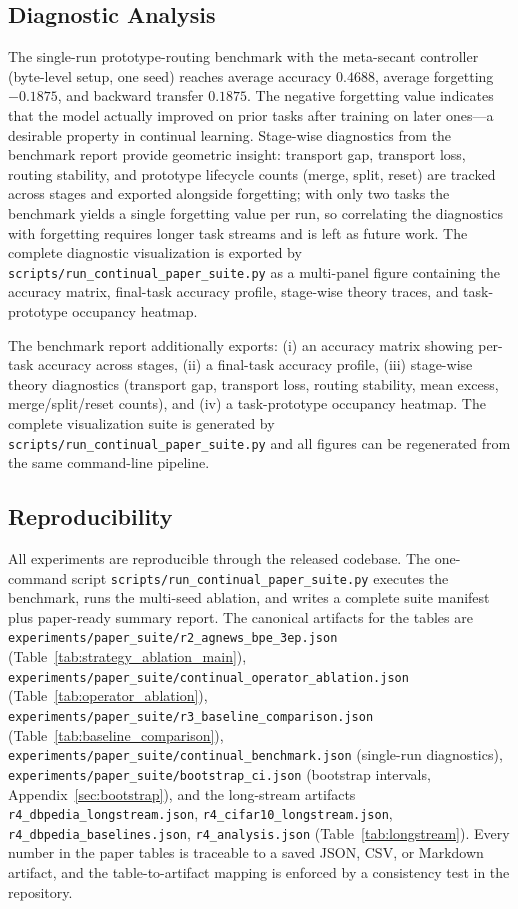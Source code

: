 \documentclass[11pt,a4paper]{article}
\theoremstyle{definition}
\begin{document}
\subsection{Diagnostic Analysis}

The single-run prototype-routing benchmark with the meta-secant controller (byte-level setup, one seed) reaches average accuracy $0.4688$, average forgetting $-0.1875$, and backward transfer $0.1875$. The negative forgetting value indicates that the model actually improved on prior tasks after training on later ones---a desirable property in continual learning. Stage-wise diagnostics from the benchmark report provide geometric insight: transport gap, transport loss, routing stability, and prototype lifecycle counts (merge, split, reset) are tracked across stages and exported alongside forgetting; with only two tasks the benchmark yields a single forgetting value per run, so correlating the diagnostics with forgetting requires longer task streams and is left as future work. The complete diagnostic visualization is exported by \texttt{scripts/run\_continual\_paper\_suite.py} as a multi-panel figure containing the accuracy matrix, final-task accuracy profile, stage-wise theory traces, and task-prototype occupancy heatmap.

The benchmark report additionally exports: (i) an accuracy matrix showing per-task accuracy across stages, (ii) a final-task accuracy profile, (iii) stage-wise theory diagnostics (transport gap, transport loss, routing stability, mean excess, merge/split/reset counts), and (iv) a task-prototype occupancy heatmap. The complete visualization suite is generated by \texttt{scripts/run\_continual\_paper\_suite.py} and all figures can be regenerated from the same command-line pipeline.

\subsection{Reproducibility}

All experiments are reproducible through the released codebase. The one-command script \texttt{scripts/run\_continual\_paper\_suite.py} executes the benchmark, runs the multi-seed ablation, and writes a complete suite manifest plus paper-ready summary report. The canonical artifacts for the tables are \texttt{experiments/paper\_suite/r2\_agnews\_bpe\_3ep.json} (Table~\ref{tab:strategy_ablation_main}), \texttt{experiments/paper\_suite/continual\_operator\_ablation.json} (Table~\ref{tab:operator_ablation}), \texttt{experiments/paper\_suite/r3\_baseline\_comparison.json} (Table~\ref{tab:baseline_comparison}), \texttt{experiments/paper\_suite/continual\_benchmark.json} (single-run diagnostics), \texttt{experiments/paper\_suite/bootstrap\_ci.json} (bootstrap intervals, Appendix~\ref{sec:bootstrap}), and the long-stream artifacts \texttt{r4\_dbpedia\_longstream.json}, \texttt{r4\_cifar10\_longstream.json}, \texttt{r4\_dbpedia\_baselines.json}, \texttt{r4\_analysis.json} (Table~\ref{tab:longstream}). Every number in the paper tables is traceable to a saved JSON, CSV, or Markdown artifact, and the table-to-artifact mapping is enforced by a consistency test in the repository.
\end{document}
